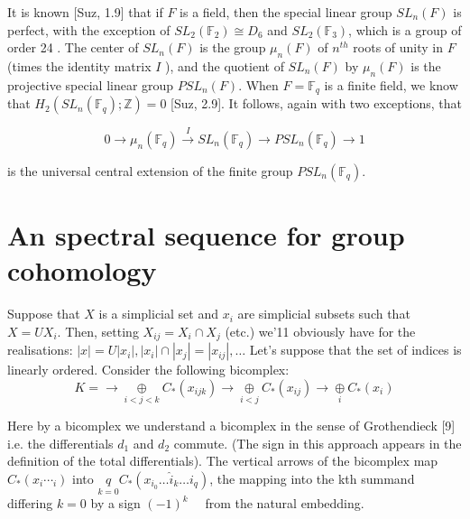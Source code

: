     \begin{example}
It is known [Suz, 1.9] that if $F$ is a field, then the special linear group $S L_n(F)$ is perfect, with the exception of $S L_2\left(\mathbb{F}_2\right) \cong D_6$ and $S L_2\left(\mathbb{F}_3\right)$, which is a group of order 24 . The center of $S L_n(F)$ is the group $\mu_n(F)$ of $n^{t h}$ roots of unity in $F$ (times the identity matrix $I$ ), and the quotient of $S L_n(F)$ by $\mu_n(F)$ is the projective special linear group $P S L_n(F)$.  
When $F=\mathbb{F}_q$ is a finite field, we know that $H_2\left(S L_n\left(\mathbb{F}_q\right) ; \mathbb{Z}\right)=0$ [Suz, 2.9]. It follows, again with two exceptions, that

$$
0 \rightarrow \mu_n\left(\mathbb{F}_q\right) \xrightarrow{I} S L_n\left(\mathbb{F}_q\right) \rightarrow P S L_n\left(\mathbb{F}_q\right) \rightarrow 1
$$

is the universal central extension of the finite group $P S L_n\left(\mathbb{F}_q\right)$.
    \end{example}






\section{An spectral sequence for group cohomology}
Suppose that $X$ is a simplicial set and $x_i$ are simplicial subsets such that $X=U X_i$. Then, setting $X_{i j}=X_i \cap X_j$ (etc.) we'11 obviously have for the realisations: $|x|=U\left|x_i\right|,\left|x_i\right| \cap\left|x_j\right|=\left|x_{i j}\right|, \ldots$ Let's suppose that the set of indices is linearly ordered. Consider the following bicomplex:
$$ K = \longrightarrow \underset{i<j<k}{\oplus} C_*\left(x_{i j k}\right) \longrightarrow \underset{i<j}{\oplus} C_*\left(x_{i j}\right)\longrightarrow \underset{i}{\oplus} C_*\left(x_{i}\right) $$


Here by a bicomplex we understand a bicomplex in the sense of Grothendieck [9] i.e. the differentials $d_1$ and $d_2$ commute. (The sign in this approach appears in the definition of the total differentials). The vertical arrows of the bicomplex map $C_*\left(x_i \cdots_i\right)$ into $\underset{k=0}{q} C_*\left(x_{i_0} \ldots \hat{i}_k \ldots i_q\right)$, the mapping into the kth summand differing $k=0$ by a sign $(-1)^k \quad$ from the natural embedding.

